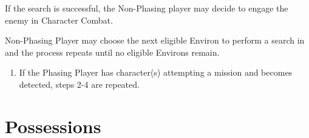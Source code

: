 \documentclass[12pt,letterpaper]{scrreprt}
\begin{document}
\begin{usecase}
{                        \item If the search is successful, the Non-Phasing player may decide to engage the enemy in Character Combat.
                        \item Non-Phasing Player may choose the next eligible Environ to perform a search in and the process repeats until no eligible Environs remain.
                                \begin{enumerate}
                                        \item If the Phasing Player has character(s) attempting a mission and becomes detected, steps 2-4 are repeated.
                                \end{enumerate}
                }
                \end{usecase}

        \section{Possessions}
\end{document}
